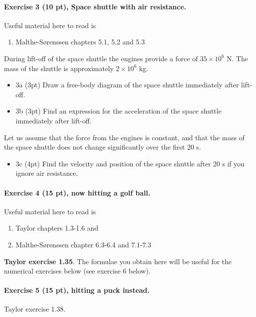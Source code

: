 \documentclass[%
oneside,                 %
final,                   %
10pt]{article}
\begin{document}
\noindent
\paragraph{Exercise 3 (10 pt), Space shuttle with air resistance.}
Useful material here to read is
\begin{enumerate}
\item Malthe-Sørenssen chapters 5.1, 5.2 and 5.3
\end{enumerate}

\noindent
During lift-off of the space shuttle the engines provide a force of $35\times 10^{6}$ N. The mass of the shuttle is approximately
$2\times 10^6$ kg.
\begin{itemize}
\item 3a (3pt) Draw a free-body diagram of the space shuttle immediately after lift-off.

\item 3b (3pt)  Find an expression for the acceleration of the space shuttle immediately after lift-off.
\end{itemize}

\noindent
Let us assume that the force from the engines is constant, and that the mass of the
space shuttle does not change significantly over the first 20 s.
\begin{itemize}
\item 3c (4pt) Find the velocity and position of the space shuttle after 20 s if you ignore air resistance.
\end{itemize}

\noindent
\paragraph{Exercise 4 (15 pt), now hitting a golf ball.}
Useful material here to read is
\begin{enumerate}
\item Taylor chapters 1.3-1.6 and

\item Malthe-Sørenssen chapter 6.3-6.4 and 7.1-7.3
\end{enumerate}

\noindent
\textbf{Taylor exercise 1.35}. The formulae you obtain here will be useful for the numerical exercises below (see exercise 6 below).

\paragraph{Exercise 5 (15 pt), hitting a puck instead.}
Taylor exercise 1.38. 
\end{document}
